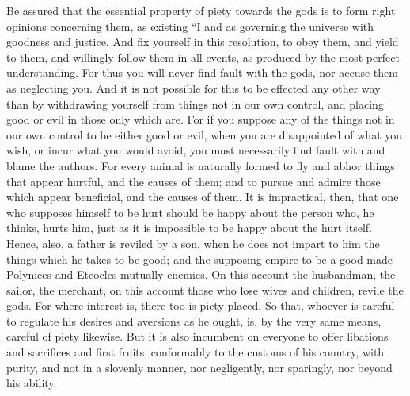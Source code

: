 \documentclass[12pt]{article}
\begin{document}
Be assured that the essential property of piety towards the gods
is to form right opinions concerning them, as existing ``I and as governing
the universe with goodness and justice. And fix yourself in this resolution,
to obey them, and yield to them, and willingly follow them in all
events, as produced by the most perfect understanding. For thus you
will never find fault with the gods, nor accuse them as neglecting
you. And it is not possible for this to be effected any other way
than by withdrawing yourself from things not in our own control, and
placing good or evil in those only which are. For if you suppose any
of the things not in our own control to be either good or evil, when
you are disappointed of what you wish, or incur what you would avoid,
you must necessarily find fault with and blame the authors. For every
animal is naturally formed to fly and abhor things that appear hurtful,
and the causes of them; and to pursue and admire those which appear
beneficial, and the causes of them. It is impractical, then, that
one who supposes himself to be hurt should be happy about the person
who, he thinks, hurts him, just as it is impossible to be happy about
the hurt itself. Hence, also, a father is reviled by a son, when he
does not impart to him the things which he takes to be good; and the
supposing empire to be a good made Polynices and Eteocles mutually
enemies. On this account the husbandman, the sailor, the merchant,
on this account those who lose wives and children, revile the gods.
For where interest is, there too is piety placed. So that, whoever
is careful to regulate his desires and aversions as he ought, is,
by the very same means, careful of piety likewise. But it is also
incumbent on everyone to offer libations and sacrifices and first
fruits, conformably to the customs of his country, with purity, and
not in a slovenly manner, nor negligently, nor sparingly, nor beyond
his ability. 

\section{}
\end{document}

